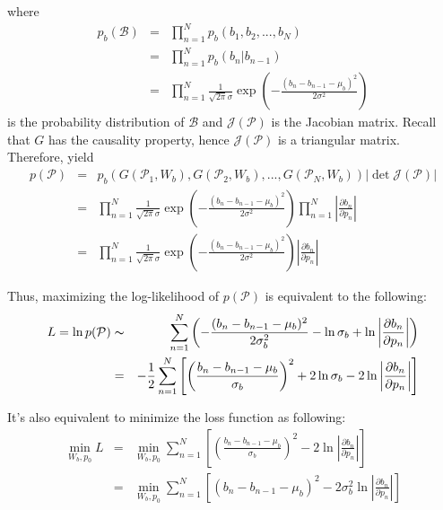\documentclass[11pt]{article}
\begin{document}
where
\begin{eqnarray}
p_b({\mathcal{B}}) &=& \prod_{n=1}^{N} p_b(b_1, b_2, ..., b_N) \\
                   &=& \prod_{n=1}^{N} p_b(b_n|b_{n-1}) \\
                   &=& \prod_{n=1}^{N} \frac{1}{\sqrt{2 \pi} \sigma} \exp\left(-\frac{(b_{n}-b_{n-1}-\mu_{b})^2}{2 \sigma^2}\right)
\end{eqnarray}
is the probability distribution of \(\mathcal{B}\) and \(\mathcal{J(P)}\) is the Jacobian matrix. Recall that \(G\) has the
causality property, hence \(\mathcal{J(P)}\) is a triangular matrix. Therefore, yield
\begin{eqnarray}
p(\mathcal{P}) &=& p_b(G(\mathcal{P}_1, W_b), G(\mathcal{P}_2, W_b), ..., G(\mathcal{P}_N, W_b)) \left|\det \mathcal{J(P)}\right| \\
               &=& \prod_{n=1}^{N} \frac{1}{\sqrt{2 \pi} \sigma} \exp\left(-\frac{(b_{n}-b_{n-1}-\mu_{b})^2}{2 \sigma^2}\right)
                   \prod_{n=1}^{N} \left| \frac{\partial b_n}{\partial p_n} \right| \\
               &=& \prod_{n=1}^{N} \frac{1}{\sqrt{2 \pi} \sigma} \exp\left(-\frac{(b_{n}-b_{n-1}-\mu_{b})^2}{2 \sigma^2}\right) \left|\frac{\partial b_n}{\partial p_n}\right|
\end{eqnarray}

Thus, maximizing the log-likelihood of \(p(\mathcal{P})\) is equivalent to the following:
\begin{eqnarray}
L = \ln p(\mathcal{P}) &\thicksim& \sum_{n=1}^{N} \left(- \frac{(b_n-b_{n-1}-\mu_{b})^2}{2 \sigma_{b}^2} - \ln \sigma_{b} + \ln \left|\frac{\partial b_n}{\partial p_n}\right|\right) \\
  &=& - \frac{1}{2} \sum_{n=1}^{N} \left[\left(\frac{b_n - b_{n-1} - \mu_{b}}{\sigma_b} \right)^2 + 2 \ln \sigma_{b} - 2 \ln \left|\frac{\partial b_n}{\partial p_n}\right|\right]
\end{eqnarray}

It's also equivalent to minimize the loss function as following:
\begin{eqnarray}
\min_{W_b, p_0} L &=& \min_{W_b, p_0} \sum_{n=1}^{N} \left[\left(\frac{b_n - b_{n-1} - \mu_{b}}{\sigma_b} \right)^2 - 2 \ln \left|\frac{\partial b_n}{\partial p_n}\right|\right] \\
       &=& \min_{W_b, p_0} \sum_{n=1}^{N} \left[\left( b_n - b_{n-1} - \mu_{b}\right)^2 - 2 \sigma_{b}^2 \ln \left|\frac{\partial b_n}{\partial p_n}\right|\right]
\end{eqnarray}
\end{document}
